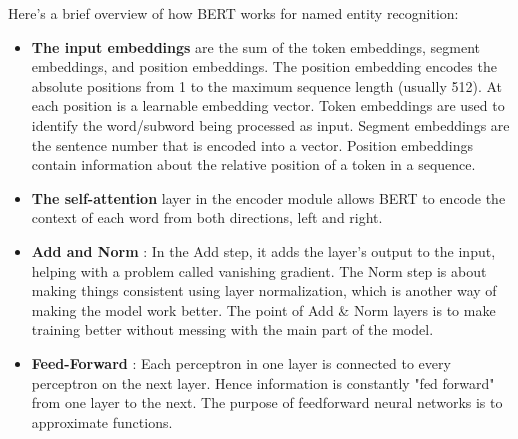 Here’s a brief overview of how BERT works for named entity recognition:
\begin{itemize}
    \item \textbf{The input embeddings} are the sum of the token embeddings, segment embeddings, and position embeddings. The position embedding encodes the absolute positions from 1 to the maximum sequence length (usually 512). At each position is a learnable embedding vector. Token embeddings are used to identify the word/subword being processed as input. Segment embeddings are the sentence number that is encoded into a vector. Position embeddings contain information about the relative position of a token in a sequence.
    \item \textbf{The self-attention} layer in the encoder module allows BERT to encode the context of each word from both directions, left and right.
    \item \textbf{Add and Norm} : In the Add step, it adds the layer's output to the input, helping with a problem called vanishing gradient. The Norm step is about making things consistent using layer normalization, which is another way of making the model work better. The point of Add \& Norm layers is to make training better without messing with the main part of the model.
    \item \textbf{Feed-Forward} : Each perceptron in one layer is connected to every perceptron on the next layer. Hence information is constantly "fed forward" from one layer to the next. The purpose of feedforward neural networks is to approximate functions.
\end{itemize}


 





